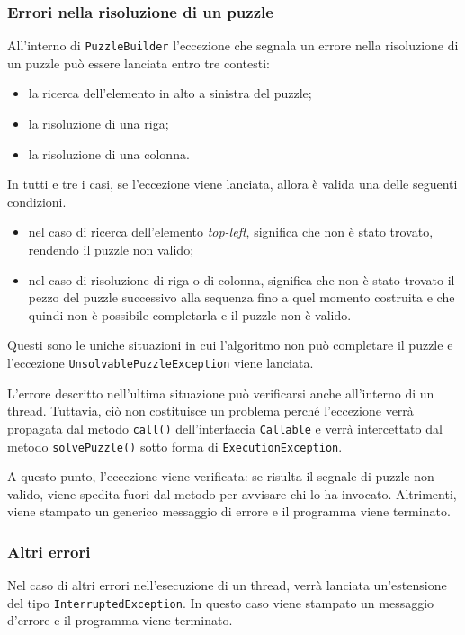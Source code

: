 \documentclass[a4paper, 12pt]{article}
\begin{document}
\subsubsection{Errori nella risoluzione di un puzzle}
All'interno di \verb|PuzzleBuilder| l'eccezione che segnala un errore nella
risoluzione di un puzzle può essere lanciata entro tre contesti:
\begin{itemize}
\item la ricerca dell'elemento in alto a sinistra del puzzle;
\item la risoluzione di una riga;
\item la risoluzione di una colonna.
\end{itemize}

In tutti e tre i casi, se l'eccezione viene lanciata, allora è valida una delle
seguenti condizioni.

\begin{itemize}
\item nel caso di ricerca dell'elemento \emph{top-left}, significa che non è
stato trovato, rendendo il puzzle non valido;
\item nel caso di risoluzione di riga o di colonna, significa che non è stato
trovato il pezzo del puzzle successivo alla sequenza fino a quel momento
costruita e che quindi non è possibile completarla e il puzzle non è valido.
\end{itemize}

Questi sono le uniche situazioni in cui l'algoritmo non può completare il puzzle
e l'eccezione \verb|UnsolvablePuzzleException| viene lanciata.

L'errore descritto nell'ultima situazione può verificarsi anche all'interno di
un thread. Tuttavia, ciò non costituisce un problema perché l'eccezione verrà
propagata dal metodo \verb|call()| dell'interfaccia \verb|Callable| e verrà
intercettato dal metodo \verb|solvePuzzle()| sotto forma di
\verb|ExecutionException|.

A questo punto, l'eccezione viene verificata: se risulta il segnale di puzzle
non valido, viene spedita fuori dal metodo per avvisare chi lo ha invocato.
Altrimenti, viene stampato un generico messaggio di errore e il programma viene
terminato.

\subsubsection{Altri errori}

Nel caso di altri errori nell'esecuzione di un thread, verrà lanciata
un'estensione del tipo \verb|InterruptedException|. In questo caso viene
stampato un messaggio d'errore e il programma viene terminato.
\end{document}
